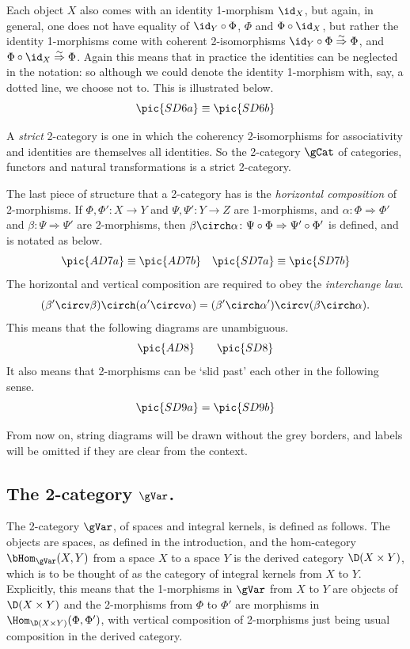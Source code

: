Each object $X$ also comes with an identity 1-morphism $\id_X$, but
again, in general, one does not have equality of ${\id_Y}\circ \Phi$,
$\Phi$ and $\Phi\circ\id_X$, but rather the identity 1-morphisms come
with coherent 2-isomorphisms ${\id_Y}\circ\Phi\stackrel\sim
\Rightarrow\Phi$, and $\Phi\circ\id_X\stackrel\sim\Rightarrow\Phi$.
Again this means that in practice the identities can be neglected in
the notation: so although we could denote the identity 1-morphism
with, say, a dotted line, we choose not to. This is illustrated below.
\[\pic{SD6a}\equiv\pic{SD6b}\]


A \emph{strict} 2-category is one in which the coherency
2-isomorphisms for associativity and identities are themselves all
identities.  So the 2-category $\gCat$ of categories, functors and
natural transformations is a strict 2-category.


The last piece of structure that a 2-category has is the
\emph{horizontal composition} of 2-morphisms.  If $\Phi,\Phi'\colon
X\to Y$ and $\Psi,\Psi'\colon Y\to Z$ are 1-morphisms, and
$\alpha\colon \Phi\Rightarrow\Phi'$ and $\beta\colon
\Psi\Rightarrow\Psi'$ are 2-morphisms, then $\beta\circh \alpha\colon
\Psi\circ\Phi\Rightarrow\Psi'\circ\Phi'$ is defined, and is notated as
below.
\[\pic{AD7a}\equiv\pic{AD7b}\quad\pic{SD7a}\equiv\pic{SD7b}\]
The horizontal and vertical composition are required to obey the
\emph{interchange law}.
\[(\beta'\circv\beta)\circh(\alpha'\circv\alpha)=
(\beta'\circh\alpha')\circv(\beta\circh\alpha).\]
This means that the following diagrams are unambiguous.
\[\pic{AD8}\qquad\pic{SD8}\]
It also means that 2-morphisms can be `slid past' each other in the
following sense.
\[\pic{SD9a}=\pic{SD9b}\]

From now on, string diagrams will be drawn without the grey borders, and labels will be omitted if they are clear from the context.


 \subsection{The 2-category $\gVar$.}
The 2-category $\gVar$, of spaces and integral kernels, is defined as
follows.  The objects are spaces, as defined in the introduction, and the hom-category $\bHom_\gVar(X,Y)$ from a space $X$
to a space $Y$ is the derived category $\D(X\times Y)$, which is to be
thought of as the category of integral kernels from $X$ to $Y$.
Explicitly, this means that the 1-morphisms in $\gVar$ from $X$ to $Y$
are objects of $\D(X\times Y)$ and the 2-morphisms from $\Phi$ to
$\Phi'$ are morphisms in $\Hom_{\D(X\times Y)}(\Phi,\Phi')$, with
vertical composition of 2-morphisms just being usual composition in
the derived category.

